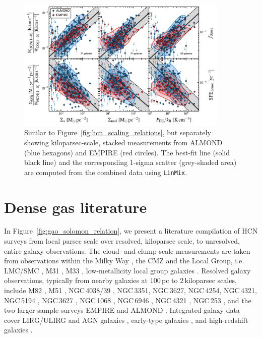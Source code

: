 \documentclass[letter, longauth]{aa} %
\begin{document}
\begin{appendix}
\begin{figure}
\centering
\includegraphics[width=0.9\textwidth]{Figures/HCN_scaling_relations_empire_vs_almond_compressed_v2.pdf}
\caption{Similar to Figure~\ref{fig:hcn_scaling_relations}, but separately showing kiloparsec-scale, stacked measurements from ALMOND (blue hexagons) and EMPIRE (red circles).
The best-fit line (solid black line) and the corresponding 1-sigma scatter (grey-shaded area) are computed from the combined data using \texttt{LinMix}.
}
\label{fig:hcn_scaling_relations_almond_vs_empire}
\end{figure}


\section{Dense gas literature}
\label{sec:app:literature}

In Figure~\ref{fig:gao_solomon_relation}, we present a literature compilation of HCN surveys from local parsec scale over resolved, kiloparsec scale, to unresolved, entire galaxy observations.
The cloud- and clump-scale measurements are taken from observations within the Milky Way \citep{Wu2010, Lada2012, Evans2014, Stephens2016}, the CMZ \citep{Jones2012, Barnes2017} and the Local Group, i.e. LMC/SMC \citep{Chin1997, Chin1998}, M31 \citep{Brouillet2005}, M33 \citep{Buchbender2013}, low-metallicity local group galaxies \citep{Braine2017}.
Resolved galaxy observations, typically from nearby galaxies at $100\,$pc to $2\,$kiloparsec scales, include M82 \citep{Kepley2014}, M51 \citep{Usero2015, Chen2017, Querejeta2019, Stuber2023}, NGC\,4038/39 \citep{Bigiel2015}, NGC\,3351, NGC\,3627, NGC\,4254, NGC\,4321, NGC\,5194 \citep{Gallagher2018a}, NGC\,3627 \citep{Beslic2021}, NGC\,1068 \citep{Sanchez-Garcia2022}, NGC\,6946 \citep{Eibensteiner2022}, NGC\,4321 \citep{Neumann2024}, NGC\,253 \citep{Beslic2024}, and the two larger-sample surveys EMPIRE \citep[nine galaxies; ][]{Jimenez-Donaire2019} and ALMOND \citep[25 galaxies; ][]{Neumann2023a}.
Integrated-galaxy data cover LIRG/ULIRG and AGN galaxies \citep{Krips2008, Gracia-Carpio2008, Juneau2009, Garcia-Burillo2012, Privon2015}, early-type galaxies \citep{Crocker2012}, and high-redshift galaxies \citep{Gao2007, Rybak2022}.


\end{appendix}
\end{document}
